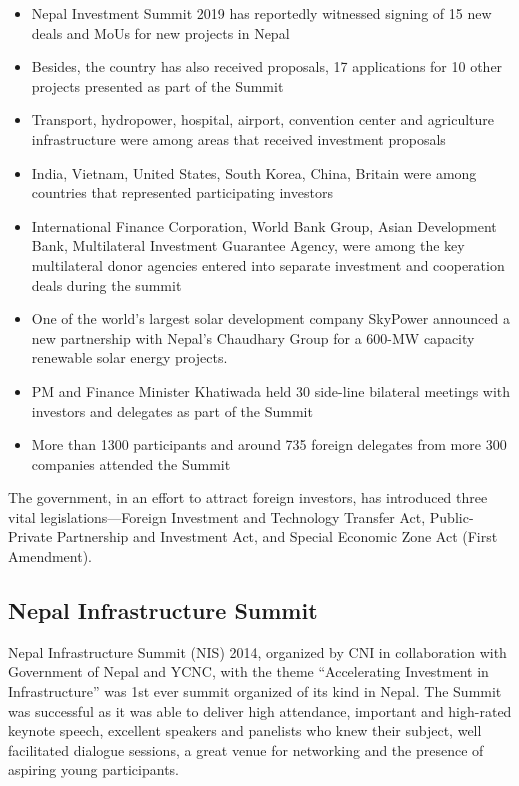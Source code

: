 \documentclass[
  openany]{book}
\providecommand{\tightlist}{%
  \setlength{\itemsep}{0pt}\setlength{\parskip}{0pt}}
\begin{document}
\begin{itemize}
\tightlist
\item
  Nepal Investment Summit 2019 has reportedly witnessed signing of 15 new deals and MoUs for new projects in Nepal
\item
  Besides, the country has also received proposals, 17 applications for 10 other projects presented as part of the Summit
\item
  Transport, hydropower, hospital, airport, convention center and agriculture infrastructure were among areas that received investment proposals
\item
  India, Vietnam, United States, South Korea, China, Britain were among countries that represented participating investors
\item
  International Finance Corporation, World Bank Group, Asian Development Bank, Multilateral Investment Guarantee Agency, were among the key multilateral donor agencies entered into separate investment and cooperation deals during the summit
\item
  One of the world's largest solar development company SkyPower announced a new partnership with Nepal's Chaudhary Group for a 600-MW capacity renewable solar energy projects.
\item
  PM and Finance Minister Khatiwada held 30 side-line bilateral meetings with investors and delegates as part of the Summit
\item
  More than 1300 participants and around 735 foreign delegates from more 300 companies attended the Summit
\end{itemize}

The government, in an effort to attract foreign investors, has introduced three vital legislations---Foreign Investment and Technology Transfer Act, Public-Private Partnership and Investment Act, and Special Economic Zone Act (First Amendment).

\hypertarget{nepal-infrastructure-summit}{%
\subsection{Nepal Infrastructure Summit}\label{nepal-infrastructure-summit}}

Nepal Infrastructure Summit (NIS) 2014, organized by CNI in collaboration with Government of Nepal and YCNC, with the theme ``Accelerating Investment in Infrastructure'' was 1st ever summit organized of its kind in Nepal. The Summit was successful as it was able to deliver high attendance, important and high-rated keynote speech, excellent speakers and panelists who knew their subject, well facilitated dialogue sessions, a great venue for networking and the presence of aspiring young participants.
\end{document}
